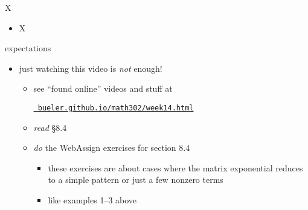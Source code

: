 \documentclass[urlcolor=blue,dvipsnames]{beamer}
\begin{document}
\begin{frame}{X}

\begin{itemize}
\item X
\end{itemize}
\end{frame}


\begin{frame}{expectations}

\begin{itemize}
\item just watching this video is \emph{not} enough!
     \begin{itemize}
     \item see ``found online'' videos and stuff at

     \centerline{\href{https://bueler.github.io/math302/week14.html}{\tt \color{cyan} bueler.github.io/math302/week14.html}}
     \item \emph{read} \S8.4
     \item \emph{do} the WebAssign exercises for section 8.4
         \begin{itemize}
         \item these exercises are about cases where the matrix exponential reduces to a simple pattern or just a few nonzero terms
         \item like examples 1--3 above
         \end{itemize}
     \end{itemize}
\end{itemize}
\end{frame}
\end{document}
